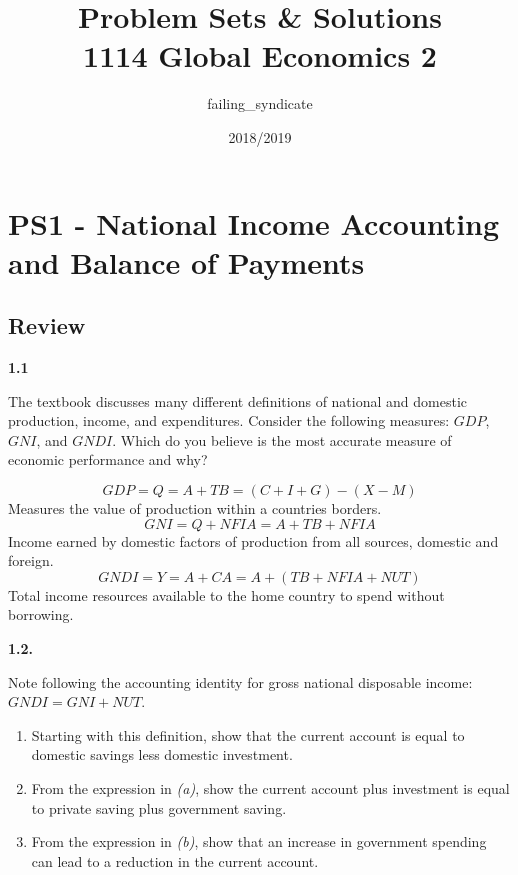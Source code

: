 \documentclass[11pt, a4paper]{article}
\title{%
 Problem Sets \& Solutions\\
 \large 1114 Global Economics 2}
\date{2018/2019}
\author{failing\_syndicate}
\begin{document}
\maketitle
{}
\clearpage
{}

\tableofcontents

\clearpage

\section*{PS1 - National Income Accounting and Balance of Payments}

\subsection*{Review}

\textbf{1.1}


The textbook discusses many different definitions of national and domestic
production, income, and expenditures. Consider the following measures: $GDP$, $GNI$,
and $GNDI$. Which do you believe is the most accurate measure of economic
performance and why?

\dotfill


$$GDP = Q = A + TB = (C+I+G)-(X-M)$$
Measures the value of production within a countries borders.
$$GNI = Q + NFIA = A + TB + NFIA $$
Income earned by domestic factors of production from all sources, domestic and foreign.
$$GNDI = Y = A + CA = A + (TB + NFIA + NUT)$$
Total income resources available to the home country to spend without borrowing.


\clearpage


\textbf{1.2.}

Note following the accounting identity for gross national disposable income:
$GNDI = GNI + NUT$.

\begin{enumerate}[label=\emph{\alph*}), topsep = \lineskip, itemsep = \lineskip, partopsep = \lineskip, parsep = \lineskip]
	\item Starting with this definition, show that the current account is equal to domestic savings less domestic investment.
	\item From the expression in \textit{(a)}, show the current account plus investment is equal to private saving plus government saving.
  \item From the expression in \textit{(b)}, show that an increase in government spending can lead to a reduction in the current account.
\end{enumerate}
\end{document}
